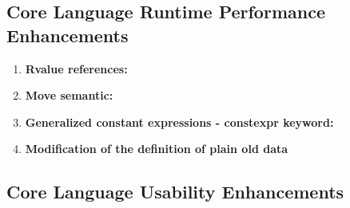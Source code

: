 \documentclass[11pt]{report}
\begin{document}
\subsection{Core Language Runtime Performance Enhancements}
\label{subsection: Runtime performance}
\begin{enumerate}
\item \textbf{Rvalue references:} 
\item \textbf{Move semantic:}
\item \textbf{Generalized constant expressions - constexpr keyword:} 
\item \textbf{Modification of the definition of plain old data}
\end{enumerate}


\subsection{Core Language Usability Enhancements}
\label{subsection: Usability Enhancements}
\end{document}
